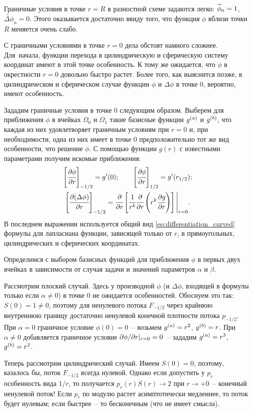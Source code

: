 Граничные условия в точке $r = R$ в разностной схеме задаются легко: ${\widetilde{\phi}}_n = 1$, $\widetilde{\Delta \phi}_n = 0$. Этого оказывается достаточно ввиду того, что функция $\phi$ вблизи точки $R$ меняется очень слабо.

С граничными условиями в точке $r = 0$ дела обстоят намного сложнее. Для~начала, функции перехода в цилиндрическую и сферическую систему координат имеют в этой точке особенность. К тому же ожидается, что $\phi$ в окрестности $r = 0$ довольно быстро растет. Более того, как выяснится позже, в цилиндрическом и сферическом случае функции $\phi$ и $\Delta \phi$ в точке $0$, вероятно, имеют особенность.

Зададим граничные условия в точке $0$ следующим образом. Выберем для приближения $\phi$ в ячейках $\Omega_0$ и $\Omega_1$ такие базисные функции ${g^{(a)}}$ и ${g^{(b)}}$, что каждая из них удовлетворяет граничным условиям при $r = 0$ и, при необходимости, одна из них имеет в точке $0$ предположительно тот же вид особенности, что решение $\phi$. С помощью функции $g(r)$ с известными параметрами получим искомые приближения:
\begin{gather*}
    \left[ \cfrac{\partial \phi}{\partial r} \right]_{-1/2} = g'(0); \qquad \left[ \cfrac{\partial \phi}{\partial r} \right]_{1/2} = g'(r_{1/2}); \\
    \left[ \cfrac{\partial (\Delta \phi)}{\partial r} \right]_{-1/2} = \cfrac{\partial }{\partial r} \left[ \cfrac{1}{r^k} \cfrac{\partial }{\partial r} \left( r^k \cfrac{\partial g}{\partial r} \right) \right] \Bigg|_{r = 0}.
\end{gather*}
В последнем выражении используется общий вид \eqref{eq:differentiation_curved} формулы для лапласиана функции, зависящей только от $r$, в прямоугольных, цилиндрических и сферических координатах.

Определимся с выбором базисных функций для приближения $\phi$ в первых двух ячейках в зависимости от случая задачи и значений параметров $\alpha$ и $\beta$.

Рассмотрим плоский случай. Здесь у производной $\phi$ (и $\Delta \phi$, входящей в формулы только если $\alpha \neq 0$) в точке $0$ не ожидается особенностей. Обоснуем это так: $S(0) = 1 \neq 0$, поэтому для ненулевого потока $F_{-1/2}$ через крайнюю внутреннюю границу достаточно ненулевой конечной плотности потока $p_{-1/2}$. При $\alpha = 0$ граничное условие $\phi(0) = 0$~-- возьмем ${g^{(a)}} = r^2$, ${g^{(b)}} = r$. При~$\alpha \neq 0$ добавляется граничное условие $\partial \phi / \partial r |_{r = 0} = 0$~-- зададим ${g^{(a)}} = r^3$, ${g^{(b)}} = r^2$.

Теперь рассмотрим цилиндрический случай. Имеем $S(0) = 0$, поэтому, казалось бы, поток $F_{-1/2}$ всегда нулевой. Однако если допустить у $p_r$ особенность вида $1/r$, то получается $p_r(r) S(r) \to 2$ при $r \to +0$~-- конечный ненулевой поток! Если $p_r$ по модулю растет асимптотически медленнее, то поток будет нулевым; если быстрее~-- то бесконечным (что не имеет смысла).

